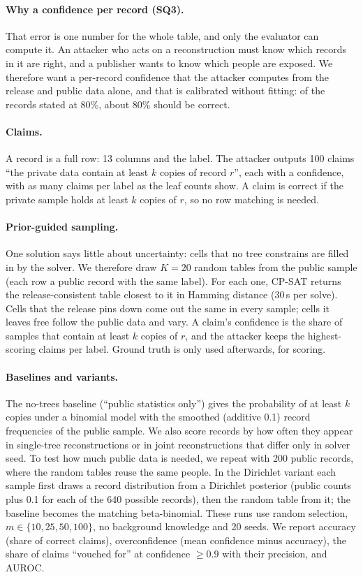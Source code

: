 \paragraph{Why a confidence per record (SQ3).} That error is one number for the whole table, and only the evaluator can compute it. An attacker who acts on a reconstruction must know which records in it are right, and a publisher wants to know which people are exposed. We therefore want a per-record confidence that the attacker computes from the release and public data alone, and that is calibrated without fitting: of the records stated at 80\%, about 80\% should be correct.

\paragraph{Claims.} A record is a full row: 13 columns and the label. The attacker outputs 100 claims ``the private data contain at least $k$ copies of record $r$'', each with a confidence, with as many claims per label as the leaf counts show. A claim is correct if the private sample holds at least $k$ copies of $r$, so no row matching is needed.

\paragraph{Prior-guided sampling.} One solution says little about uncertainty: cells that no tree constrains are filled in by the solver. We therefore draw $K=20$ random tables from the public sample (each row a public record with the same label). For each one, CP-SAT returns the release-consistent table closest to it in Hamming distance (30\,s per solve). Cells that the release pins down come out the same in every sample; cells it leaves free follow the public data and vary. A claim's confidence is the share of samples that contain at least $k$ copies of $r$, and the attacker keeps the highest-scoring claims per label. Ground truth is only used afterwards, for scoring.

\paragraph{Baselines and variants.} The no-trees baseline (``public statistics only'') gives the probability of at least $k$ copies under a binomial model with the smoothed (additive 0.1) record frequencies of the public sample. We also score records by how often they appear in single-tree reconstructions or in joint reconstructions that differ only in solver seed. To test how much public data is needed, we repeat with 200 public records, where the random tables reuse the same people. In the Dirichlet variant each sample first draws a record distribution from a Dirichlet posterior (public counts plus 0.1 for each of the 640 possible records), then the random table from it; the baseline becomes the matching beta-binomial. These runs use random selection, $m\in\{10,25,50,100\}$, no background knowledge and 20 seeds. We report accuracy (share of correct claims), overconfidence (mean confidence minus accuracy), the share of claims ``vouched for'' at confidence $\geq0.9$ with their precision, and AUROC.

